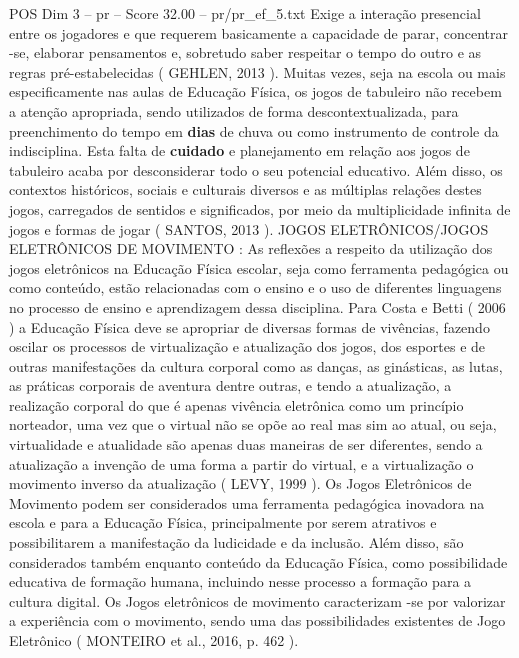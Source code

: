 \begin{textsample}{POS Dim 3 – pr – Score 32.00 – pr/pr\_ef\_5.txt}
Exige a interação presencial entre os jogadores e que requerem basicamente a capacidade de parar, concentrar -se, elaborar pensamentos e, sobretudo saber respeitar o tempo do outro e as regras pré-estabelecidas ( GEHLEN, 2013 ).
Muitas vezes, seja na escola ou mais especificamente nas aulas de Educação Física, os jogos de tabuleiro não recebem a atenção apropriada, sendo utilizados de forma descontextualizada, para preenchimento do tempo em \textbf{dias} de chuva ou como instrumento de controle da indisciplina.
Esta falta de \textbf{cuidado} e planejamento em relação aos jogos de tabuleiro acaba por desconsiderar todo o seu potencial educativo.
Além disso, os contextos históricos, sociais e culturais diversos e as múltiplas relações destes jogos, carregados de sentidos e significados, por meio da multiplicidade infinita de jogos e formas de jogar ( SANTOS, 2013 ).
JOGOS ELETRÔNICOS/JOGOS ELETRÔNICOS DE MOVIMENTO : As reflexões a respeito da utilização dos jogos eletrônicos na Educação Física escolar, seja como ferramenta pedagógica ou como conteúdo, estão relacionadas com o ensino e o uso de diferentes linguagens no processo de ensino e aprendizagem dessa disciplina.
Para Costa e Betti ( 2006 ) a Educação Física deve se apropriar de diversas formas de vivências, fazendo oscilar os processos de virtualização e atualização dos jogos, dos esportes e de outras manifestações da cultura corporal como as danças, as ginásticas, as lutas, as práticas corporais de aventura dentre outras, e tendo a atualização, a realização corporal do que é apenas vivência eletrônica como um princípio norteador, uma vez que o virtual não se opõe ao real mas sim ao atual, ou seja, virtualidade e atualidade são apenas duas maneiras de ser diferentes, sendo a atualização a invenção de uma forma a partir do virtual, e a virtualização o movimento inverso da atualização ( LEVY, 1999 ).
Os Jogos Eletrônicos de Movimento podem ser considerados uma ferramenta pedagógica inovadora na escola e para a Educação Física, principalmente por serem atrativos e possibilitarem a manifestação da ludicidade e da inclusão.
Além disso, são considerados também enquanto conteúdo da Educação Física, como possibilidade educativa de formação humana, incluindo nesse processo a formação para a cultura digital.
Os Jogos eletrônicos de movimento caracterizam -se por valorizar a experiência com o movimento, sendo uma das possibilidades existentes de Jogo Eletrônico ( MONTEIRO et al., 2016, p. 462 ).

\end{textsample}
